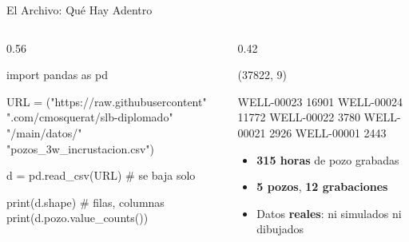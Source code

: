 \documentclass[aspectratio=169, 11pt]{beamer}
\begin{document}
\begin{frame}[fragile, shrink=20]{El Archivo: Qué Hay Adentro}
  \vspace{-4pt}
  \begin{columns}[T]
    \begin{column}{0.56\textwidth}
      \begin{pyblock}
import pandas as pd

URL = ("https://raw.githubusercontent"
       ".com/cmosquerat/slb-diplomado"
       "/main/datos/"
       "pozos_3w_incrustacion.csv")

d = pd.read_csv(URL)   # se baja solo

print(d.shape)         # filas, columnas
print(d.pozo.value_counts())
      \end{pyblock}
    \end{column}
    \begin{column}{0.42\textwidth}
      \vspace{2pt}
      \begin{outputblock}
(37822, 9)

WELL-00023    16901
WELL-00024    11772
WELL-00022     3780
WELL-00021     2926
WELL-00001     2443
      \end{outputblock}
      \vspace{4pt}
      {\footnotesize\color{textMuted}
      \begin{itemize}\setlength{\itemsep}{3pt}
        \item[{\color{arcaRed}\scriptsize\faDatabase}]
          \textbf{315 horas} de pozo grabadas
        \item[{\color{arcaRed}\scriptsize\faIndustry}]
          \textbf{5 pozos}, \textbf{12 grabaciones}
        \item[{\color{codeGreen}\scriptsize\faCheck}]
          Datos \textbf{reales}: ni simulados ni dibujados
      \end{itemize}}
    \end{column}
  \end{columns}
\end{frame}
\end{document}

